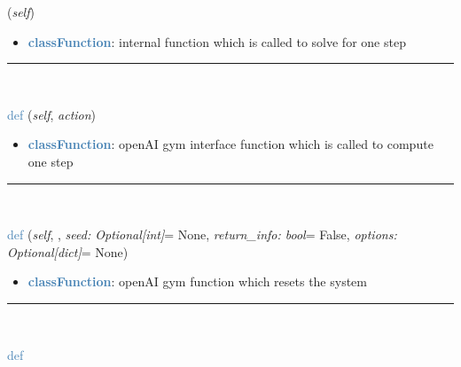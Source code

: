 \begin{itemize}[leftmargin=1.4cm]
\begin{itemize}[leftmargin=1.4cm]
\begin{flushleft}
({\it self})
\end{flushleft}
\setlength{\itemindent}{0.7cm}
\begin{itemize}[leftmargin=0.7cm]
\item[--]\textcolor{steelblue}{\bf classFunction}: internal function which is called to solve for one step
\vspace{12pt}\end{itemize}
%
\noindent\rule{8cm}{0.75pt}\vspace{1pt} \\ 
\begin{flushleft}
\noindent \textcolor{steelblue}{def {\bf {}}}\label{sec:artificialIntelligence:OpenAIGymInterfaceEnv(Env):step}
({\it self}, {\it action})
\end{flushleft}
\setlength{\itemindent}{0.7cm}
\begin{itemize}[leftmargin=0.7cm]
\item[--]\textcolor{steelblue}{\bf classFunction}: openAI gym interface function which is called to compute one step
\vspace{12pt}\end{itemize}
%
\noindent\rule{8cm}{0.75pt}\vspace{1pt} \\ 
\begin{flushleft}
\noindent \textcolor{steelblue}{def {\bf {}}}\label{sec:artificialIntelligence:OpenAIGymInterfaceEnv(Env):reset}
({\it self}, {\it *}, {\it seed: Optional[int]}= None, {\it return\_info: bool}= False, {\it options: Optional[dict]}= None)
\end{flushleft}
\setlength{\itemindent}{0.7cm}
\begin{itemize}[leftmargin=0.7cm]
\item[--]\textcolor{steelblue}{\bf classFunction}: openAI gym function which resets the system
\vspace{12pt}\end{itemize}
%
\noindent\rule{8cm}{0.75pt}\vspace{1pt} \\ 
\begin{flushleft}
\noindent \textcolor{steelblue}{def {\bf {}}}\label{sec:artificialIntelligence:OpenAIGymInterfaceEnv(Env):render}

\end{flushleft}
\end{itemize}
\end{itemize}
